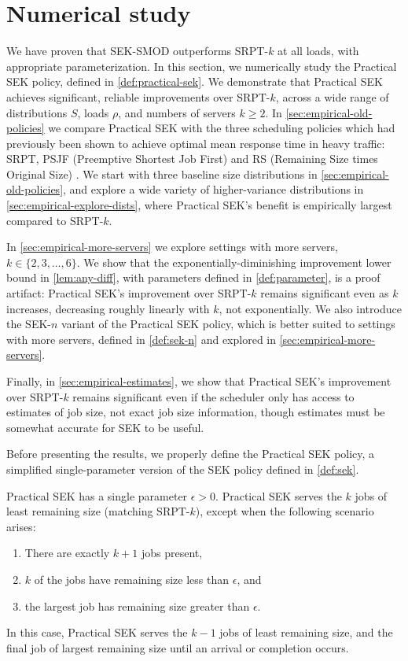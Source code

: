 \documentclass[acmsmall]{acmart}
\begin{document}
\section{Numerical study}
\label{sec:empirical}

We have proven that SEK-SMOD outperforms SRPT-$k$ at all loads, with appropriate parameterization.
In this section, we numerically study the Practical SEK policy, defined in \cref{def:practical-sek}.
We demonstrate that Practical SEK achieves significant, reliable improvements over SRPT-$k$, across a wide range of distributions $S$, loads $\rho$, and numbers of servers $k \ge 2$. In \cref{sec:empirical-old-policies} we compare Practical SEK with the three scheduling policies which had previously been shown to achieve optimal mean response time in heavy traffic: SRPT, PSJF (Preemptive Shortest Job First) and RS (Remaining Size times Original Size) \cite{grosof-etal-2019-srpt-k}.
We start with three baseline size distributions in \cref{sec:empirical-old-policies}, and explore a wide variety of higher-variance distributions in \cref{sec:empirical-explore-dists}, where Practical SEK's benefit is empirically largest compared to SRPT-$k$.

In \cref{sec:empirical-more-servers} we explore settings with more servers, $k \in \{2, 3, \ldots, 6\}$. We show that the exponentially-diminishing improvement lower bound in \cref{lem:any-diff}, with parameters defined in \cref{def:parameter}, is a proof artifact: Practical SEK's improvement over SRPT-$k$ remains significant even as $k$ increases, decreasing roughly linearly with $k$, not exponentially. We also introduce the SEK-$n$ variant of the Practical SEK policy, which is better suited to settings with more servers, defined in \cref{def:sek-n} and explored in \cref{sec:empirical-more-servers}.

Finally, in \cref{sec:empirical-estimates}, we show that Practical SEK's improvement over SRPT-$k$ remains significant even if the scheduler only has access to estimates of job size, not exact job size information, though estimates must be somewhat accurate for SEK to be useful.

Before presenting the results, we properly define the Practical SEK policy, a simplified single-parameter version of the SEK policy defined in \cref{def:sek}.
\begin{definition}\label{def:practical-sek}
    Practical SEK has a single parameter $\epsilon > 0$.
    Practical SEK serves the $k$ jobs of least remaining size (matching SRPT-$k$), except when the following scenario arises:
    \begin{enumerate}
        \item There are exactly $k+1$ jobs present,
        \item $k$ of the jobs have remaining size less than $\epsilon$, and
        \item the largest job has remaining size greater than $\epsilon$.
    \end{enumerate}
    In this case, Practical SEK serves the $k-1$ jobs of least remaining size, and the final job of largest remaining size
    until an arrival or completion occurs.
\end{definition}
\end{document}
